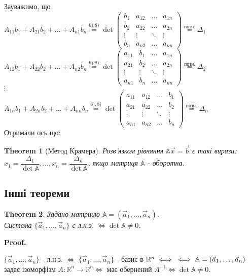 \documentclass[a4paper, 10pt]{article}
\makeatletter
\theoremstyle{theoremdd}
\newtheorem{theorem}{Theorem}[subsection]
\renewenvironment{proof}[1][Proof.\\]{\par
\pushQED{\hfill \qed}%
\normalfont \topsep6\p@\@plus6\p@\relax
\trivlist
\item\relax
{\bfseries
#1\@addpunct{.}}\hspace\labelsep\ignorespaces
}{%
\popQED\endtrivlist\@endpefalse
}
\makeatother
\begin{document}
Зауважимо, що\\
$A_{11}b_1 + A_{21}b_2 + \dots + A_{n1}b_n \overset{\textrm{6),8)}}{=} \det \begin{pmatrix}
b_1  & a_{12} & \dots & a_{1n} \\
b_2 & a_{22} & \dots & a_{2n} \\
\vdots & \vdots & \ddots & \vdots \\
b_n & a_{n2} & \dots & a_{nn}
\end{pmatrix} \overset{\text{позн.}}{=} \Delta_1$\\
$A_{12}b_1 + A_{22}b_2 + \dots + A_{n2}b_n \overset{\textrm{6),8)}}{=} \det \begin{pmatrix}
a_{11}  & b_1 & \dots & a_{1n} \\
a_{21} & b_2 & \dots & a_{2n} \\
\vdots & \vdots & \ddots & \vdots \\
a_{n1} & b_n & \dots & a_{nn}
\end{pmatrix} \overset{\text{позн.}}{=} \Delta_2$\\
$\vdots$\\
$A_{1n}b_1 + A_{2n}b_2 + \dots + A_{nn}b_n \overset{6),8)}{=} \det \begin{pmatrix}
a_{11}  & a_{12} & \dots & b_1 \\
a_{21} & a_{22} & \dots & b_2 \\
\vdots & \vdots & \ddots & \vdots \\
a_{n1} & a_{n2} & \dots & b_n
\end{pmatrix} \overset{\text{позн.}}{=} \Delta_n$\\
Отримали ось що:
\begin{theorem}[Метод Крамера]
Розв'язком рівняння $\mathbb{A} \vec{x} = \vec{b}$ є такі вирази: $x_1 = \dfrac{\Delta_1}{\det \mathbb{A}}, \dots, x_n = \dfrac{\Delta_n}{\det \mathbb{A}}$, якщо матриця $\mathbb{A}$ - оборотна.
\end{theorem}

\subsection{Інші теореми}
\begin{theorem}
Задано матрицю $\mathbb{A} = (\vec{a}_1,\dots,\vec{a}_n)$.\\
Система $\{\vec{a}_1, \dots, \vec{a}_n\}$ є л.н.з. $\iff \det \mathbb{A} \neq 0$.
\end{theorem}

\begin{proof}
$\{\vec{a}_1,\dots,\vec{a}_n\}$ - л.н.з. $\iff$ $\{\vec{a}_1,\dots,\vec{a}_n\}$ - базис в $\mathbb{R}^n \iff \\ \iff \mathbb{A} = (\vec{a}_1,\dots,\vec{a}_n)$ задає ізоморфізм $A: \mathbb{R}^n \to \mathbb{R}^n \iff$ має обернений $A^{-1} \iff \det \mathbb{A} \neq 0$.
\end{proof}
\end{document}
